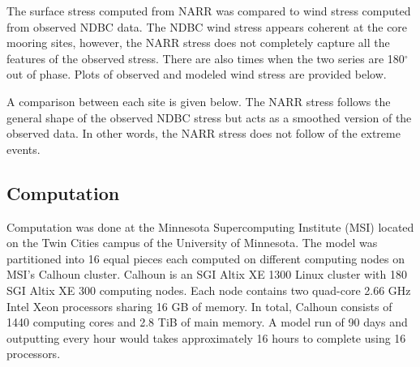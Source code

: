 The surface stress computed from NARR was compared to wind stress computed from observed NDBC data.
The NDBC wind stress appears coherent at the core mooring sites, however, the NARR stress does not completely capture all the features of the observed stress. 
There are also times when the two series are 180$^\circ$ out of phase. Plots of observed and modeled wind stress are provided below. 


A comparison between each site is given below. The NARR stress follows the general shape of the observed
NDBC stress but acts as a smoothed version of the observed data. In other words, the NARR stress does not follow
of the extreme events. 


\subsection{Computation}

Computation was done at the Minnesota Supercomputing Institute (MSI) located on the Twin Cities campus of the University of Minnesota. 
The model was partitioned into 16 equal pieces each computed on different computing nodes on MSI's Calhoun cluster.  Calhoun is an SGI Altix XE 1300 Linux cluster 
with 180 SGI Altix XE 300 computing nodes. Each node contains two quad-core 2.66 GHz Intel Xeon processors sharing 16 GB of memory.
In total, Calhoun consists of 1440 computing cores and 2.8 TiB of main memory. A model run of 90 days  and outputting every hour would takes approximately 16 hours
to complete using 16 processors. 

